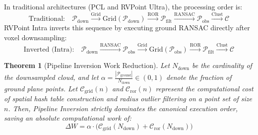 \documentclass[journal,compsoc]{IEEEtran}
\newtheorem{theorem}{Theorem}
\begin{document}
In traditional architectures (PCL and RVPoint Ultra), the processing order is:
\begin{equation}
\text{Traditional:} \quad \mathcal{P}_{\text{down}} \xrightarrow{\text{Grid}} \text{Grid}(\mathcal{P}_{\text{down}}) \xrightarrow{\text{ROR}} \mathcal{P}_{\text{filt}} \xrightarrow{\text{RANSAC}} \mathcal{P}_{\text{obs}} \xrightarrow{\text{Clust}} \mathcal{C}
\end{equation}
RVPoint Intra inverts this sequence by executing ground RANSAC directly after voxel downsampling:
\begin{equation}
\text{Inverted (Intra):} \quad \mathcal{P}_{\text{down}} \xrightarrow{\text{RANSAC}} \mathcal{P}_{\text{obs}} \xrightarrow{\text{Grid}} \text{Grid}(\mathcal{P}_{\text{obs}}) \xrightarrow{\text{ROR}} \mathcal{P}_{\text{filt}} \xrightarrow{\text{Clust}} \mathcal{C}
\end{equation}

\begin{theorem}[Pipeline Inversion Work Reduction]
Let $N_{\text{down}}$ be the cardinality of the downsampled cloud, and let $\alpha = \frac{|\mathcal{P}_{\text{ground}}|}{N_{\text{down}}} \in (0, 1)$ denote the fraction of ground plane points. Let $\mathcal{C}_{\text{grid}}(n)$ and $\mathcal{C}_{\text{ror}}(n)$ represent the computational cost of spatial hash table construction and radius outlier filtering on a point set of size $n$.
Then, Pipeline Inversion strictly dominates the canonical execution order, saving an absolute computational work of:
\begin{equation}
\Delta W = \alpha \cdot \Big( \mathcal{C}_{\text{grid}}(N_{\text{down}}) + \mathcal{C}_{\text{ror}}(N_{\text{down}}) \Big)
\label{eq:inversion_savings}
\end{equation}
\end{theorem}
\end{document}
